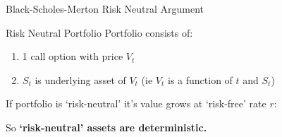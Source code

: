 \begin{frame}{Black-Scholes-Merton Risk Neutral Argument} %
	\begin{block}{Risk Neutral Portfolio}
		Portfolio consists of:
		\begin{enumerate}
			\item 1 call option with price $V_t$
			\item $S_t$ is underlying asset of $V_t$ (ie $V_t$ is a function of $t$ and $S_t$)
		\end{enumerate}
		\pause
		If portfolio is `risk-neutral' it's value grows at `risk-free' rate $r$:
		\end{block}
		So \textbf{`risk-neutral' assets are deterministic.}
\end{frame}